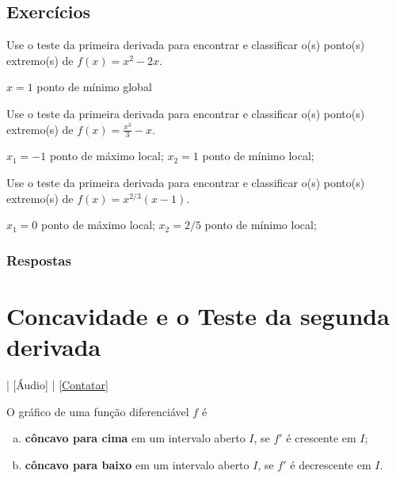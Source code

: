 \subsection{Exercícios}

\begin{exer}
  Use o teste da primeira derivada para encontrar e classificar o(s) ponto(s) extremo(s) de $f(x) = x^2 - 2x$.
\end{exer}
\begin{resp}
  $x=1$ ponto de mínimo global
\end{resp}

\begin{exer}
    Use o teste da primeira derivada para encontrar e classificar o(s) ponto(s) extremo(s) de $\displaystyle f(x) = \frac{x^3}{3}-x$.
\end{exer}
\begin{resp}
  $x_1=-1$ ponto de máximo local; $x_2=1$ ponto de mínimo local;
\end{resp}

\begin{exer}
  Use o teste da primeira derivada para encontrar e classificar o(s) ponto(s) extremo(s) de $\displaystyle f(x) = x^{2/3}(x-1)$.
\end{exer}
\begin{resp}
  $x_1=0$ ponto de máximo local; $x_2=2/5$ ponto de mínimo local;
\end{resp}

\ifisbook
\subsubsection{Respostas}
\shipoutAnswer
\fi


\section{Concavidade e o Teste da segunda derivada}\label{cap_apderiv_sec_tder2}

\begin{flushright}
  [Vídeo] | [Áudio] | \href{https://phkonzen.github.io/notas/contato.html}{[Contatar]}
\end{flushright}

O gráfico de uma função diferenciável $f$ é
\begin{enumerate}[a)]
\item {\bf côncavo para cima} em um intervalo aberto $I$, se $f'$ é crescente em $I$;
\item {\bf côncavo para baixo} em um intervalo aberto $I$, se $f'$ é decrescente em $I$.
\end{enumerate}

